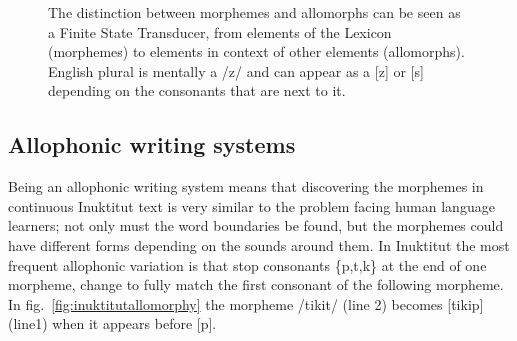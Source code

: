 \documentclass[runningheads,a4paper]{llncs}
\begin{document}
\begin{figure}[h]
	
%
%
%
%
%
%
%
%
%
%
% 
%
%
%
%

	\caption{The distinction between morphemes and allomorphs can be seen as a Finite State Transducer, from elements of the Lexicon (morphemes) to elements in context of other elements (allomorphs). English plural is mentally a /z/ and can appear as a [z] or [s] depending on the consonants that are next to it.}
	\label{fig:cats}
\end{figure}

\subsection{Allophonic writing systems}
\label{allomorphy}

Being an allophonic writing system means that discovering the morphemes in continuous Inuktitut text is very similar to the problem facing human language learners; not only must the word boundaries be found, but the  morphemes could have different forms depending on the sounds around them. In Inuktitut the most frequent allophonic variation is that stop consonants \{p,t,k\} at the end of one morpheme, change to fully match the first consonant of the following morpheme. In fig.~\ref{fig:inuktitutallomorphy} the morpheme /tikit/ (line 2) becomes [tikip] (line1) when it appears before [p]. 
\end{document}
